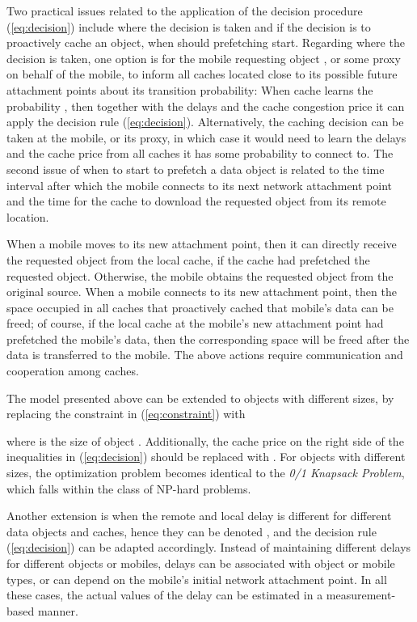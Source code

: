 \documentclass[conference]{IEEEtran}
\begin{document}
Two practical issues related to the application of the  decision procedure (\ref{eq:decision}) include where the decision is taken and if the decision is to proactively cache an object, when should prefetching start.
Regarding where the decision is taken, one option is for the mobile requesting object , or some proxy on behalf of the mobile, to inform all  caches located close to its possible future attachment points about its transition probability: When cache  learns the probability , then together with the delays  and the cache congestion price  it can apply the decision rule (\ref{eq:decision}). Alternatively, the  caching decision can be taken at the mobile, or its proxy, in which case it would need to learn the delays  and the cache  price  from all caches it has some probability to connect to.
The second issue of when to start to prefetch a data object is related to the time interval after which the mobile connects to its next network attachment point and the time for the cache to download the requested object from its remote location.

When a mobile moves to its new attachment point, then it can directly receive the requested object from the local cache, if the cache had prefetched the requested  object. Otherwise, the mobile  obtains the requested object from the original source. When a mobile connects to its new attachment point, then the space occupied in all caches that proactively  cached that mobile's data can be freed; of course, if the local cache at the mobile's new attachment point had prefetched the mobile's data, then the corresponding space will be freed after the data is transferred to the mobile. The above actions require communication and cooperation among caches.

The  model presented above can be extended to objects with different sizes, by replacing the constraint in (\ref{eq:constraint}) with

where  is the size of  object .
Additionally,  the cache price  on the right side of the inequalities in (\ref{eq:decision}) should be replaced with .
For objects with different sizes, the optimization problem becomes identical to the \emph{0/1 Knapsack Problem}, which falls within the class of NP-hard problems.


Another extension is when the remote and local delay is different for different data objects and caches, hence they can be denoted ,  and the
decision rule (\ref{eq:decision}) can be adapted accordingly. Instead of maintaining different delays  for different objects or mobiles, delays can be associated with  object or mobile types, or can depend on the mobile's initial network attachment point. In all these cases, the actual values of the delay can be estimated in a measurement-based manner.
\end{document}
